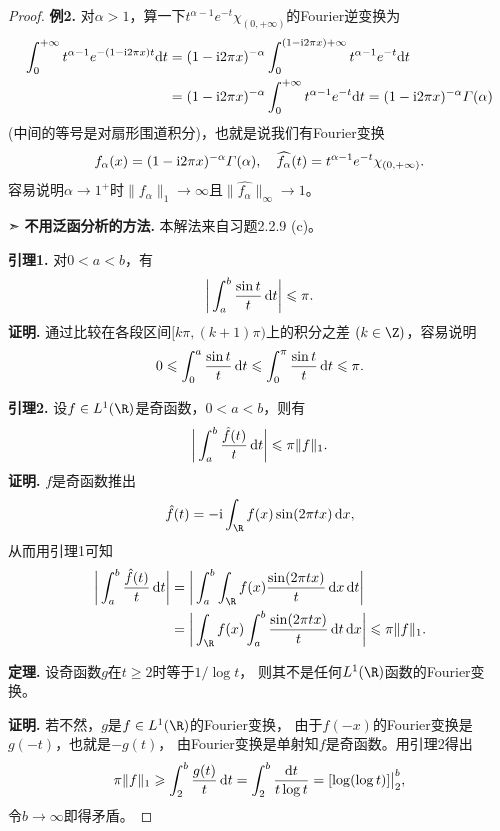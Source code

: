 \begin{proof}
    \textbf{例2.} 对$\alpha>1$，算一下$t^{\alpha-1}e^{-t}\chi_{(0,+\infty)}$的Fourier逆变换为
    \begin{align*}
        \int_0^{+\infty}t^{\alpha-1}e^{-(1-{\rm i}2\pi x)t}{\rm d}t
        &=(1-{\rm i}2\pi x)^{-\alpha}\int_0^{(1-{\rm i}2\pi x)+\infty}t^{\alpha-1}e^{-t}{\rm d}t\\
        &=(1-{\rm i}2\pi x)^{-\alpha}\int_0^{+\infty}t^{\alpha-1}e^{-t}{\rm d}t
        =(1-{\rm i}2\pi x)^{-\alpha}\varGamma(\alpha)
    \end{align*}
    (中间的等号是对扇形围道积分)，也就是说我们有Fourier变换
    \[f_\alpha(x)=(1-{\rm i}2\pi x)^{-\alpha}\varGamma(\alpha),
    \quad\widehat{f_\alpha}(t)=t^{\alpha-1}e^{-t}\chi_{(0,+\infty)}.\]
    容易说明$\alpha\to1^+$时$\|f_\alpha\|_1\to\infty$且$\|\widehat{f_\alpha}\|_\infty\to1$。
    
    ➣ \textbf{不用泛函分析的方法.} 本解法来自\cite{Gr}习题2.2.9 (c)。

    \textbf{引理1.} 对$0<a<b$，有
    \[\bigg|\int_a^b \frac{\sin t}{t} \,{\rm d}t\bigg|\leqslant\pi.\]
    \textbf{证明.} 通过比较在各段区间$[k\pi,(k+1)\pi)$上的积分之差 $(k\in\Z)$，容易说明
    \[0\leqslant\int_0^a \frac{\sin t}{t} \,{\rm d}t
    \leqslant\int_0^\pi \frac{\sin t}{t} \,{\rm d}t\leqslant\pi.\]

    \textbf{引理2.} 设$f \in L^1(\R)$是奇函数，$0<a<b$，则有
    \[\bigg|\int_a^b \frac{\hat{f}(t)}{t} \,{\rm d}t\bigg|\leqslant\pi\|f\|_1.\]
    \textbf{证明.} $f$是奇函数推出
    \[\hat{f}(t)=-{\rm i}\int_\R f(x)\sin(2\pi tx)\,{\rm d}x,\]
    从而用引理1可知
    \begin{align*}\bigg|\int_a^b\frac{\hat{f}(t)}{t}\,{\rm d}t\bigg|
    &=\bigg|\int_a^b\int_\R f(x)\frac{\sin(2\pi tx)}{t}\,{\rm d}x\,{\rm d}t\bigg|\\
    &=\bigg|\int_\R f(x) \int_a^b \frac{\sin(2\pi tx)}{t}\,{\rm d}t\,{\rm d}x\bigg|
    \leqslant\pi\|f\|_1.\end{align*}

    \textbf{定理.} 设奇函数$g$在$t \geqslant 2$时等于$1/\log t$，
    则其不是任何$L^1(\R)$函数的Fourier变换。

    \textbf{证明.} 若不然，$g$是$f \in L^1(\R)$的Fourier变换，
    由于$f(-x)$的Fourier变换是$g(-t)$，也就是$-g(t)$，
    由Fourier变换是单射知$f$是奇函数。用引理2得出
    \[\pi\|f\|_1\geqslant\int_2^b\frac{g(t)}{t}\,{\rm d}t
    =\int_2^b\frac{{\rm d}t}{t\log t}=[\log(\log t)]\big|_2^b,\]
    令$b\to\infty$即得矛盾。
\end{proof}

